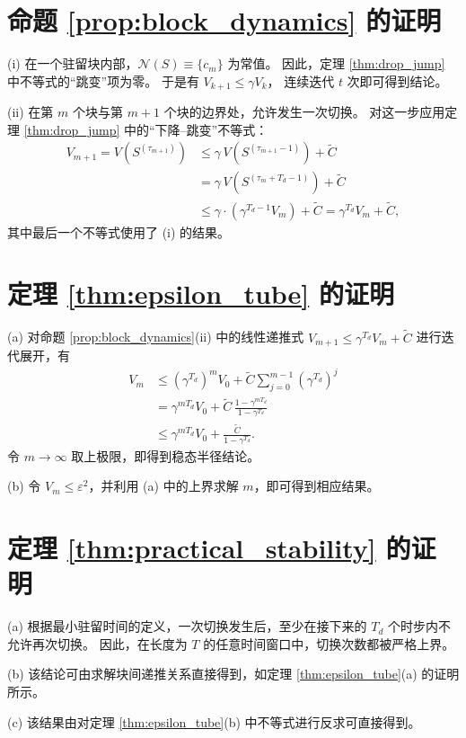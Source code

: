 \documentclass[journal]{IEEEtran}
\theoremstyle{plain}
\theoremstyle{definition}
\begin{document}
\section{命题 \ref{prop:block_dynamics} 的证明}
\label{app:proof_prop_block_dynamics}
\begin{IEEEproof}
(i) 在一个驻留块内部，$\mathcal N(S)\equiv\{c_m\}$ 为常值。
因此，定理 \ref{thm:drop_jump} 中不等式的“跳变”项为零。
于是有
$V_{k+1}\le \gamma V_k$，
连续迭代 $t$ 次即可得到结论。

(ii) 在第 $m$ 个块与第 $m+1$ 个块的边界处，允许发生一次切换。
对这一步应用定理 \ref{thm:drop_jump} 中的“下降--跳变”不等式：
\begin{equation}
\begin{split}
V_{m+1} = V(S^{(\tau_{m+1})}) & \le \gamma\,V(S^{(\tau_{m+1}-1)}) + \tilde C \\
& = \gamma\,V(S^{(\tau_m+T_d-1)}) + \tilde C \\
& \le \gamma \cdot (\gamma^{T_d-1}V_m) + \tilde C = \gamma^{T_d}V_m + \tilde C,
\end{split}
\end{equation}
其中最后一个不等式使用了 (i) 的结果。
\end{IEEEproof}

\section{定理 \ref{thm:epsilon_tube} 的证明}
\label{app:proof_thm_epsilon_tube}
\begin{IEEEproof}
(a) 对命题 \ref{prop:block_dynamics}(ii) 中的线性递推式
$V_{m+1}\le \gamma^{T_d}V_m+\tilde C$
进行迭代展开，有
\begin{equation}
\begin{split}
V_m &\le (\gamma^{T_d})^m V_0 + \tilde C \sum_{j=0}^{m-1}(\gamma^{T_d})^j \\
    &= \gamma^{mT_d}V_0 + \tilde C\,\frac{1-\gamma^{mT_d}}{1-\gamma^{T_d}} \\
    &\le \gamma^{mT_d}V_0+\frac{\tilde C}{1-\gamma^{T_d}}.
\end{split}
\end{equation}
令 $m\to\infty$ 取上极限，即得到稳态半径结论。

(b) 令 $V_m\le \varepsilon^2$，并利用 (a) 中的上界求解 $m$，即可得到相应结果。
\end{IEEEproof}

\section{定理 \ref{thm:practical_stability} 的证明}
\label{app:proof_thm_practical_stability}
\begin{IEEEproof}
(a) 根据最小驻留时间的定义，一次切换发生后，至少在接下来的 $T_d$ 个时步内不允许再次切换。
因此，在长度为 $T$ 的任意时间窗口中，切换次数都被严格上界。

(b) 该结论可由求解块间递推关系直接得到，如定理 \ref{thm:epsilon_tube}(a) 的证明所示。

(c) 该结果由对定理 \ref{thm:epsilon_tube}(b) 中不等式进行反求可直接得到。
\end{IEEEproof}
\end{document}
